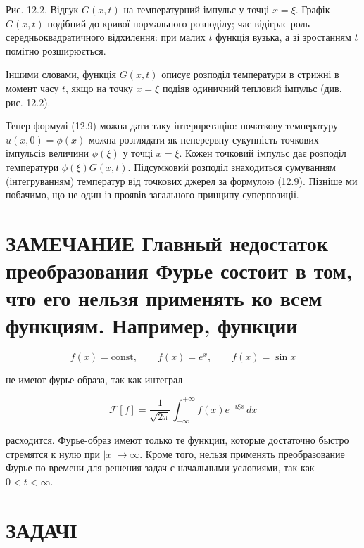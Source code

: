 \documentclass[
  ukrainian,
]{article}
\begin{document}
Рис. 12.2. Відгук \(G(x,t)\) на температурний імпульс у точці \(x=\xi\).
Графік \(G(x,t)\) подібний до кривої нормального розподілу; час відіграє
роль середньоквадратичного відхилення: при малих \(t\) функція вузька, а
зі зростанням \(t\) помітно розширюється.

Іншими словами, функція \(G(x, t)\) описує розподіл температури в
стрижні в момент часу \(t\), якщо на точку \(x=\xi\) подіяв одиничний
тепловий імпульс (див. рис. 12.2).

Тепер формулі (12.9) можна дати таку інтерпретацію: початкову
температуру \(u(x,0)=\phi(x)\) можна розглядати як неперервну сукупність
точкових імпульсів величини \(\phi(\xi)\) у точці \(x=\xi\). Кожен
точковий імпульс дає розподіл температури \(\phi(\xi)G(x,t)\).
Підсумковий розподіл знаходиться сумуванням (інтегруванням) температур
від точкових джерел за формулою (12.9). Пізніше ми побачимо, що це один
із проявів загального принципу суперпозиції.

\section{ЗАМЕЧАНИЕ Главный недостаток преобразования Фурье состоит в
том, что его нельзя применять ко всем функциям. Например,
функции}\label{ux437ux430ux43cux435ux447ux430ux43dux438ux435-ux433ux43bux430ux432ux43dux44bux439-ux43dux435ux434ux43eux441ux442ux430ux442ux43eux43a-ux43fux440ux435ux43eux431ux440ux430ux437ux43eux432ux430ux43dux438ux44f-ux444ux443ux440ux44cux435-ux441ux43eux441ux442ux43eux438ux442-ux432-ux442ux43eux43c-ux447ux442ux43e-ux435ux433ux43e-ux43dux435ux43bux44cux437ux44f-ux43fux440ux438ux43cux435ux43dux44fux442ux44c-ux43aux43e-ux432ux441ux435ux43c-ux444ux443ux43dux43aux446ux438ux44fux43c.-ux43dux430ux43fux440ux438ux43cux435ux440-ux444ux443ux43dux43aux446ux438ux438}

\[
f(x)=\text{const}, \qquad f(x)=e^x, \qquad f(x)=\sin x
\]

не имеют фурье-образа, так как интеграл

\[
\mathcal{F}[f] = \frac{1}{\sqrt{2\pi}} \int_{-\infty}^{+\infty} f(x)e^{-i\xi x}\,dx
\]

расходится. Фурье-образ имеют только те функции, которые достаточно
быстро стремятся к нулю при \(|x| \to \infty\). Кроме того, нельзя
применять преобразование Фурье по времени для решения задач с начальными
условиями, так как \(0 < t < \infty\).

\section{ЗАДАЧІ}\label{ux437ux430ux434ux430ux447ux456-1}
\end{document}

